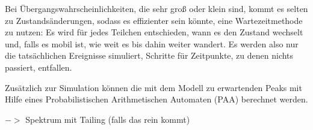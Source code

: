 \documentclass[a4paper,10pt]{article}
\begin{document}
Bei Übergangswahrscheinlichkeiten, die sehr groß oder klein sind, kommt es selten zu Zustandsänderungen, sodass es effizienter sein könnte, eine Wartezeitmethode zu nutzen: Es wird für jedes Teilchen entschieden, wann es den Zustand wechselt und, falls es mobil ist, wie weit es bis dahin weiter wandert. Es werden also nur die tatsächlichen Ereignisse simuliert, Schritte für Zeitpunkte, zu denen nichts passiert, entfallen.

Zusätzlich zur Simulation können die mit dem Modell zu erwartenden Peaks mit Hilfe eines Probabilistischen Arithmetischen Automaten (PAA)  berechnet werden.







$->$ Spektrum mit Tailing (falls das rein kommt)


\listoftodos
\end{document}
